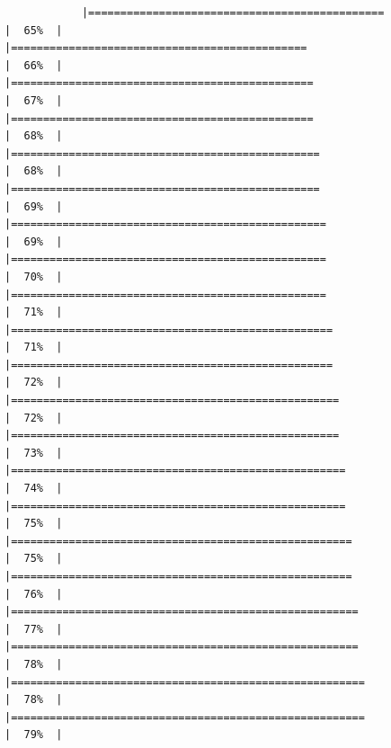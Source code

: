\documentclass[
]{article}
\begin{document}
\begin{verbatim}
            |==============================================                        |  65%  |                                                                              |==============================================                        |  66%  |                                                                              |===============================================                       |  67%  |                                                                              |===============================================                       |  68%  |                                                                              |================================================                      |  68%  |                                                                              |================================================                      |  69%  |                                                                              |=================================================                     |  69%  |                                                                              |=================================================                     |  70%  |                                                                              |=================================================                     |  71%  |                                                                              |==================================================                    |  71%  |                                                                              |==================================================                    |  72%  |                                                                              |===================================================                   |  72%  |                                                                              |===================================================                   |  73%  |                                                                              |====================================================                  |  74%  |                                                                              |====================================================                  |  75%  |                                                                              |=====================================================                 |  75%  |                                                                              |=====================================================                 |  76%  |                                                                              |======================================================                |  77%  |                                                                              |======================================================                |  78%  |                                                                              |=======================================================               |  78%  |                                                                              |=======================================================               |  79%  |                                                                   
\end{verbatim}
\end{document}
